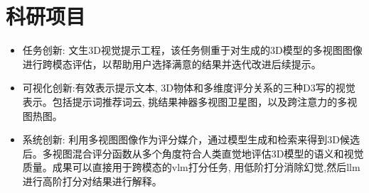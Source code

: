 \documentclass[UTF8,AutoFakeBold]{resume}
\begin{document}
\section{\hspace{0.25em}\makebox[0.75em][c]{\faFlask} \fangsong\textbf{科研项目}}
    \begin{itemize}
    \item[\faThumbTack] \kaishu 任务创新: 文生3D视觉提示工程，该任务侧重于对生成的3D模型的多视图图像进行跨模态评估，以帮助用户选择满意的结果并迭代改进后续提示。
    \item[\faThumbTack] \kaishu 可视化创新:有效表示提示文本, 3D物体和多维度评分关系的三种D3写的视觉表示。包括提示词推荐词云, 挑结果神器多视图卫星图，以及跨注意力的多视图热图。
    \item[\faThumbTack] \kaishu 系统创新: 利用多视图图像作为评分媒介，通过模型生成和检索来得到3D候选后。多视图混合评分函数从多个角度符合人类直觉地评估3D模型的语义和视觉质量。成果可以直接用于跨模态的vlm打分任务, 用低阶打分消除幻觉,然后llm进行高阶打分对结果进行解释。
    \end{itemize}
\end{document}
